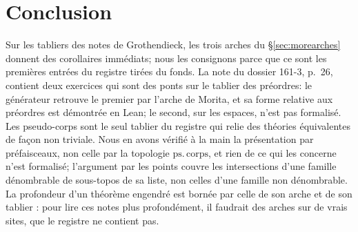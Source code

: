 \section{Conclusion}\label{sec:nconclusion}

Sur les tabliers des notes de Grothendieck, les trois arches du \S\ref{sec:morearches} donnent des corollaires immédiats; nous les consignons parce que ce sont les premières entrées du registre tirées du fonds. La note du dossier 161-3, p.~26, contient deux exercices qui sont des ponts sur le tablier des préordres: le générateur retrouve le premier par l'arche de Morita, et sa forme relative aux préordres est démontrée en Lean; le second, sur les espaces, n'est pas formalisé. Les pseudo-corps sont le seul tablier du registre qui relie des théories équivalentes de façon non triviale. Nous en avons vérifié à la main la présentation par préfaisceaux, non celle par la topologie $\mathrm{ps.\,corps}$, et rien de ce qui les concerne n'est formalisé; l'argument par les points couvre les intersections d'une famille dénombrable de sous-topos de sa liste, non celles d'une famille non dénombrable. La profondeur d'un théorème engendré est bornée par celle de son arche et de son tablier \cite[transparent 8]{caramello-mines}: pour lire ces notes plus profondément, il faudrait des arches sur de vrais sites, que le registre ne contient pas.
